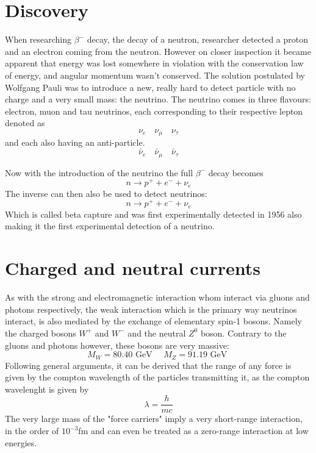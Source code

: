 \documentclass[11pt,a4paper,faculty=we,language=en,doctype=report]{cls/ugent-doc}
\begin{document}
\section{Discovery}
When researching $\beta^-$ decay, the decay of a neutron, researcher
detected a proton and an electron coming from the neutron. However
on closer inspection it became apparent that energy was lost
somewhere in violation with the conservation law of energy, and
angular momentum wasn't conserved.  The solution postulated by
Wolfgang Pauli was to introduce a new, really hard to detect
particle with no charge and a very small mass: the neutrino.  The neutrino comes in three flavours:
electron, muon and tau neutrinos, each corresponding to their respective lepton denoted as
\begin{equation}
	\nu_e \quad \nu_\mu \quad \nu_\tau
\end{equation}
and each also having an anti-particle.
\begin{equation}
	\bar{\nu}_e \quad \bar{\nu}_\mu \quad \bar{\nu}_\tau
\end{equation}

Now with the introduction of the neutrino the full $\beta^-$ decay
becomes
\begin{equation}
	n \rightarrow p^+ + e^- + \nu_e
\end{equation}
The inverse can then also be used to detect neutrinos:
\begin{equation}
	n \rightarrow p^+ + e^- + \nu_e
\end{equation}
Which is called beta capture and was first experimentally detected in 1956
\cite{BetaCapture} also making it the first experimental detection of a
neutrino.
\section{Charged and neutral currents}
As with the strong and electromagnetic interaction whom interact via gluons
and photons respectively, the weak interaction which is the primary way
neutrinos interact, is also mediated by the exchange of elementary spin-1
bosons.  Namely the charged bosons $W^+$ and $W^-$ and the neutral $Z^0$ boson.
Contrary to the gluons and photons however, these bosons are very massive:
\begin{equation}
  M_W = 80.40\text{ GeV }\quad M_Z = 91.19\text{ GeV }
\end{equation}
Following general arguments, it can be derived that the
range of any force is given by the compton wavelength of the particles transmitting it\cite{martin2017particle},
as the compton wavelenght is given by 
\begin{equation}
  \lambda = \frac{h}{mc}
\end{equation}
The very large mass of the "force carriers" imply a very short-range
interaction, in the order of $10^{-3}$fm and can even be treated as a
zero-range interaction at low energies.
\end{document}
